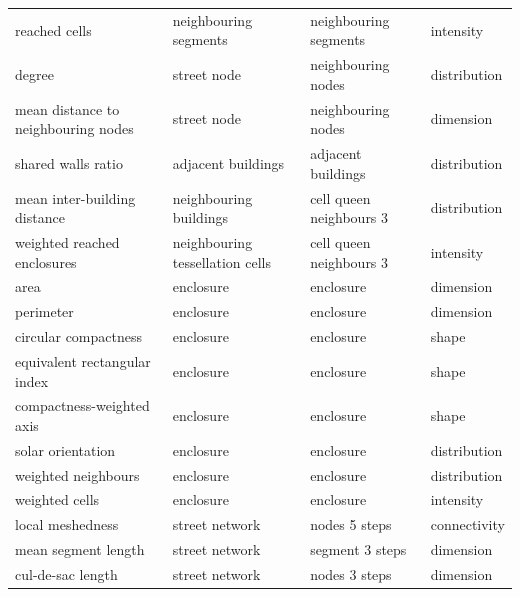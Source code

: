 \begin{longtable}{p{5cm}p{4cm}p{4cm}l}
                           reached cells &           neighbouring segments &      neighbouring segments &    intensity \\
                                  degree &                     street node &         neighbouring nodes & distribution \\
     mean distance to neighbouring nodes &                     street node &         neighbouring nodes &    dimension \\
                      shared walls ratio &             adjacent buildings  &        adjacent buildings  & distribution \\
            mean inter-building distance &          neighbouring buildings &    cell queen neighbours 3 & distribution \\
             weighted reached enclosures & neighbouring tessellation cells &    cell queen neighbours 3 &    intensity \\
                                    area &                       enclosure &                  enclosure &    dimension \\
                               perimeter &                       enclosure &                  enclosure &    dimension \\
                    circular compactness &                       enclosure &                  enclosure &        shape \\
            equivalent rectangular index &                       enclosure &                  enclosure &        shape \\
               compactness-weighted axis &                       enclosure &                  enclosure &        shape \\
                       solar orientation &                       enclosure &                  enclosure & distribution \\
                     weighted neighbours &                       enclosure &                  enclosure & distribution \\
                          weighted cells &                       enclosure &                  enclosure &    intensity \\
                        local meshedness &                  street network &              nodes 5 steps & connectivity \\
                     mean segment length &                  street network &            segment 3 steps &    dimension \\
                       cul-de-sac length &                  street network &              nodes 3 steps &    dimension \\

\end{longtable}
